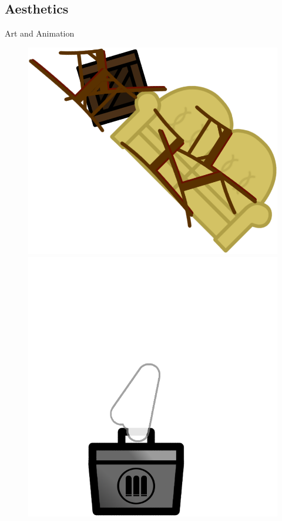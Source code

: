 \documentclass{beamer}
\begin{document}
\subsection{Aesthetics}

\begin{frame}{Art and Animation}
  \begin{figure}
    \centering
    \includegraphics[scale=0.1]{../game/static/img/barricade_stairs.png}
    \includegraphics[scale=0.1]{../game/static/img/ghost_ammobox.png}

\end{figure}
\end{frame}
\end{document}
